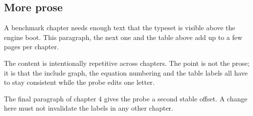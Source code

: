 \subsection{More prose}
A benchmark chapter needs enough text that the type\-set is visible above the
engine boot. This paragraph, the next one and the table above add up to a few
pages per chapter.

The content is intentionally repetitive across chapters. The point is not the
prose; it is that the include graph, the equation numbering and the table
labels all have to stay consistent while the probe edits one letter.

The final paragraph of chapter 4 gives the probe a second stable offset. A
change here must not invalidate the labels in any other chapter.
